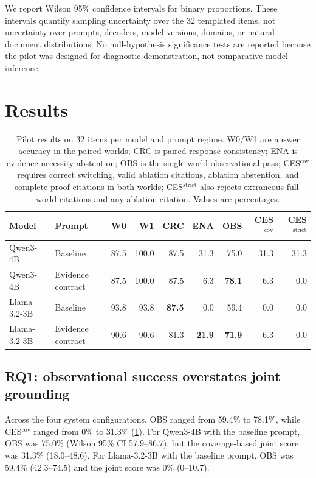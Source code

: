\documentclass[10pt,twocolumn]{article}
\begin{document}
We report Wilson 95\% confidence intervals for binary proportions. These intervals quantify sampling uncertainty over the 32 templated items, not uncertainty over prompts, decoders, model versions, domains, or natural document distributions. No null-hypothesis significance tests are reported because the pilot was designed for diagnostic demonstration, not comparative model inference.

\section{Results}

\begin{table}[t]
\centering
\small
\setlength{\tabcolsep}{5.2pt}
\caption{Pilot results on 32 items per model and prompt regime. W0/W1 are answer accuracy in the paired worlds; CRC is paired response consistency; ENA is evidence-necessity abstention; OBS is the single-world observational pass; CES$^{\mathrm{cov}}$ requires correct switching, valid ablation citations, ablation abstention, and complete proof citations in both worlds; CES$^{\mathrm{strict}}$ also rejects extraneous full-world citations and any ablation citation. Values are percentages.}
\label{tab:main}
\begin{tabular}{llrrrrrrr}
\toprule
Model & Prompt & W0 & W1 & CRC & ENA & OBS & CES$^{\mathrm{cov}}$ & CES$^{\mathrm{strict}}$\\
\midrule
Qwen3-4B & Baseline & 87.5 & 100.0 & 87.5 & 31.3 & 75.0 & 31.3 & 31.3\\
Qwen3-4B & Evidence contract & 87.5 & 100.0 & 87.5 & 6.3 & \textbf{78.1} & 6.3 & 0.0\\
Llama-3.2-3B & Baseline & 93.8 & 93.8 & \textbf{87.5} & 0.0 & 59.4 & 0.0 & 0.0\\
Llama-3.2-3B & Evidence contract & 90.6 & 90.6 & 81.3 & \textbf{21.9} & \textbf{71.9} & 6.3 & 0.0\\
\bottomrule
\end{tabular}
\end{table}

\subsection{RQ1: observational success overstates joint grounding}

Across the four system configurations, OBS ranged from 59.4\% to 78.1\%, while CES$^{\mathrm{cov}}$ ranged from 0\% to 31.3\% (\cref{tab:main}). For Qwen3-4B with the baseline prompt, OBS was 75.0\% (Wilson 95\% CI 57.9--86.7), but the coverage-based joint score was 31.3\% (18.0--48.6). For Llama-3.2-3B with the baseline prompt, OBS was 59.4\% (42.3--74.5) and the joint score was 0\% (0--10.7).
\end{document}
